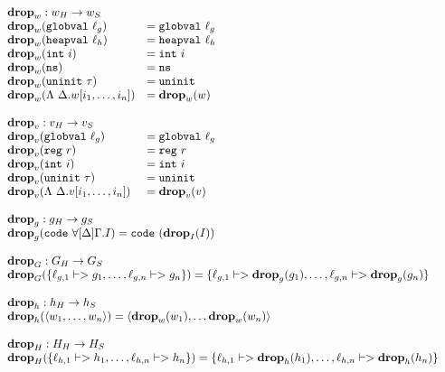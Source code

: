 {\footnotesize
\[\begin{array}{l}
\begin{array}{ll}
\rlap{$\drop{w} : \high w -> \simple{w}$} \\
\drop{w}(\mathtt{globval}\ \ell_g) &= \mathtt{globval}\ \ell_g \\
\drop{w}(\mathtt{heapval}\ \ell_h) &= \mathtt{heapval}\ \ell_h \\
\drop{w}(\mathtt{int}\ i) &= \mathtt{int}\ i \\
\drop{w}(\mathtt{ns}) &= \mathtt{ns} \\
\drop{w}(\mathtt{uninit}\ \tau) &= \mathtt{uninit} \\
\drop{w}(\Lambda\ \Delta.w[i_1, \dots, i_n]) &= \drop{w}(w) \\\\

\rlap{$\drop{v} : \high v -> \simple{v}$} \\
\drop{v}(\mathtt{globval}\ \ell_g) &= \mathtt{globval}\ \ell_g \\
\drop{v}(\mathtt{reg}\ r) &= \mathtt{reg}\ r \\
\drop{v}(\mathtt{int}\ i) &= \mathtt{int}\ i \\
\drop{v}(\mathtt{uninit}\ \tau) &= \mathtt{uninit} \\
\drop{v}(\Lambda\ \Delta.v[i_1, \dots, i_n]) &= \drop{v}(v)
\end{array} \\\\

\begin{array}{l}
\drop{g} : \high g -> \simple{g} \\
\drop{g}(\mathtt{code}\ \forall[\Delta]\Gamma.I) = \mathtt{code}\ (\drop{I}(I)) \\\\

\drop{G} : \high G -> \simple{G} \\
\drop{G}(\{\ell_{g,1} |-> g_1, \dots, \ell_{g,n} |-> g_n\}) = \{\ell_{g,1} |-> \drop{g}(g_1), \dots, \ell_{g,n} |-> \drop{g}(g_n)\} \\\\

\drop{h} : \high h -> \simple{h} \\
\drop{h}(\langle w_1, \dots, w_n \rangle) = \langle \drop{w}(w_1), \dots \drop{w}(w_n)\rangle \\\\

\drop{H} : \high H -> \simple{H} \\
\drop{H}(\{\ell_{h,1} |-> h_1, \dots, \ell_{h,n} |-> h_n\}) = \{\ell_{h,1} |-> \drop{h}(h_1), \dots, \ell_{h,n} |-> \drop{h}(h_n)\}
\end{array} \\\\


\end{array}\]}
